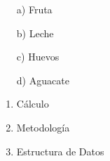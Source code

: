 \documentclass[12pt]{article}
\begin{document}
        \begin{itemize}

            \item[a)] Fruta
            \item[b)] Leche
            \item[c)] Huevos
            \item[d)] Aguacate
            
        \end{itemize}

        \begin{enumerate}
            
            \item Cálculo
            \item Metodología
            \item Estructura de Datos
            
        \end{enumerate}
\end{document}
